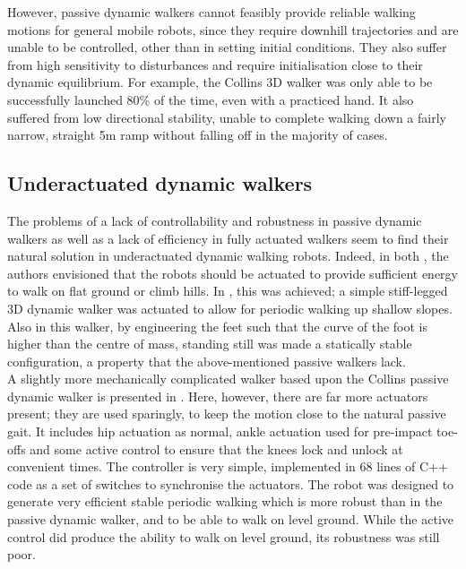 However, passive dynamic walkers cannot feasibly provide reliable walking motions for general mobile robots, since they require downhill trajectories and are unable to be controlled, other than in setting initial conditions. They also suffer from high sensitivity to disturbances and require initialisation close to their dynamic equilibrium. For example, the Collins 3D walker was only able to be successfully launched 80\% of the time, even with a practiced hand. It also suffered from low directional stability, unable to complete walking down a fairly narrow, straight 5m ramp without falling off in the majority of cases.

\subsection{Underactuated dynamic walkers}
The problems of a lack of controllability and robustness in passive dynamic walkers as well as a lack of efficiency in fully actuated walkers seem to find their natural solution in underactuated dynamic  walking robots. Indeed, in both \cite{mcgeer1990passive, collins2001three}, the authors envisioned that the robots should be actuated to provide sufficient energy to walk on flat ground or climb hills. In \cite{tedrake2004actuating}, this was achieved; a simple stiff-legged 3D dynamic walker was actuated to allow for periodic walking up shallow slopes. Also in this walker, by engineering the feet such that the curve of the foot is higher than the centre of mass, standing still was made a statically stable configuration, a property that the above-mentioned passive walkers lack. \\

A slightly more mechanically complicated walker based upon the Collins passive dynamic walker is presented in \cite{collins2005bipedal}. Here, however, there are far more actuators present; they are used sparingly, to keep the motion close to the natural passive gait. It includes hip actuation as normal, ankle actuation used for pre-impact toe-offs and some active control to ensure that the knees lock and unlock at convenient times. The controller is very simple, implemented in 68 lines of C++ code as a set of switches to synchronise the actuators. The robot was designed to generate very efficient stable periodic walking which is more robust than in the passive dynamic walker, and to be able to walk on level ground. While the active control did produce the ability to walk on level ground, its robustness was still poor.

